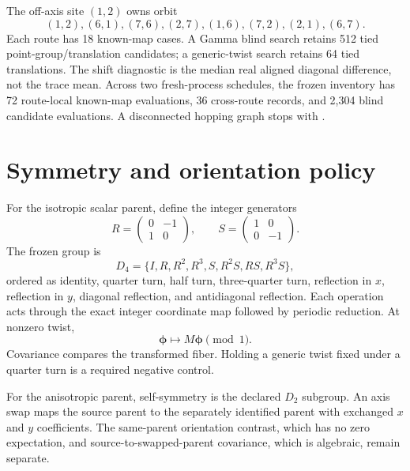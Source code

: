 \documentclass[11pt]{article}
\begin{document}
The off-axis site $(1,2)$ owns orbit
\begin{equation}
  (1,2),(6,1),(7,6),(2,7),(1,6),(7,2),(2,1),(6,7).
\end{equation}
Each route has 18 known-map cases.  A Gamma blind search retains 512 tied
point-group/translation candidates; a generic-twist search retains 64 tied translations.
The shift diagnostic is the median real aligned diagonal difference, not the trace mean.
Across two fresh-process schedules, the frozen inventory has 72 route-local known-map
evaluations, 36 cross-route records, and 2,304 blind candidate evaluations.  A
disconnected hopping graph stops with
.

\section{Symmetry and orientation policy}

For the isotropic scalar parent, define the integer generators
\begin{equation}
  R=\begin{pmatrix}0&-1\\1&0\end{pmatrix},
  \qquad
  S=\begin{pmatrix}1&0\\0&-1\end{pmatrix}.
\end{equation}
The frozen group is
\begin{equation}
  D_4=\{I,R,R^2,R^3,S,R^2S,RS,R^3S\},
\end{equation}
ordered as identity, quarter turn, half turn, three-quarter turn, reflection in $x$,
reflection in $y$, diagonal reflection, and antidiagonal reflection.  Each operation
acts through the exact integer coordinate map followed by periodic reduction.  At
nonzero twist,
\begin{equation}
  \boldsymbol\phi\mapsto M\boldsymbol\phi\pmod 1.
\end{equation}
Covariance compares the transformed fiber.  Holding a generic twist fixed under a
quarter turn is a required negative control.

For the anisotropic parent, self-symmetry is the declared $D_2$ subgroup.  An axis swap
maps the source parent to the separately identified parent with exchanged $x$ and $y$
coefficients.  The same-parent orientation contrast, which has no zero expectation, and
source-to-swapped-parent covariance, which is algebraic, remain separate.
\end{document}
